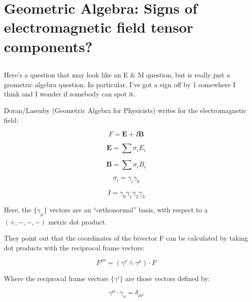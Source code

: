 
%

%
%

\chapter{Geometric Algebra: Signs of electromagnetic field tensor components? }
\label{chap:emTensor}
\date{ May 30, 2008.  $RCSfile: emTensor.tex,v $ Last $Revision: 1.9 $ $Date: 2009/06/14 23:51:45 $ }



\section{}

Here's a question that may look like an E \& M question, but is really just a geometric algebra question.  In particular, I've got a sign off by 1 somewhere I think and I wonder if somebody can spot it.

Doran/Lasenby (Geometric Algebra for Physicists) writes for the electromagnetic field:

\[
F = \mathbf{E} + I\mathbf{B}
\]

\[
\mathbf{E} = \sum \sigma_i E_i
\]

\[
\mathbf{B} = \sum \sigma_i B_i
\]

\[
\sigma_i = \gamma_i \gamma_0
\]

\[
I = \gamma_0 \gamma_1 \gamma_2 \gamma_3
\]

Here, the $\{\gamma_\mu\}$ vectors are an ``orthonormal'' basis, with respect to a $(+,-,-,-)$ metric dot product.

They point out that the coordinates of the bivector F can be calculated by taking dot products with the reciprocal frame vectors:

\[
F^{\mu\nu} = (\gamma^\nu \wedge \gamma^\mu) \cdot F
\]

Where the reciprocal frame vectors $\{\gamma^i\}$ are those vectors defined by:

\[
\gamma^\mu \cdot \gamma_\nu = \delta_{\mu\nu}
\]

